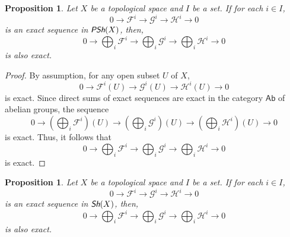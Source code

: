 \documentclass[oneside,11pt]{amsart}
\newtheorem{prop}[thm]{Proposition}
\theoremstyle{definition}
\theoremstyle{remark}
\begin{document}
\begin{prop}\label{prop1}
 Let $X$ be a topological space and $I$ be a set. If for each $i\in I$,
 \begin{equation*}
 0 \longrightarrow  \mathscr{F}^{i} \longrightarrow \mathscr{G}^{i} \longrightarrow \mathscr{H}^{i} \longrightarrow 0  
 \end{equation*}
 is an exact sequence in $\emph{\textsf{PSh}}(X)$, then,
 \begin{equation*}
   0 \longrightarrow  \bigoplus_{i}\mathscr{F}^{i} \longrightarrow \bigoplus_{i}\mathscr{G}^{i} \longrightarrow \bigoplus_{i}\mathscr{H}^{i} \longrightarrow 0 
 \end{equation*}
 is also exact.
\end{prop}
\begin{proof}
By assumption, for any open subset $U$ of $X$,
\begin{equation*}
 0 \longrightarrow \mathscr{F}^{i}(U)  \longrightarrow \mathscr{G}^{i}(U) \longrightarrow \mathscr{H}^{i}(U) \longrightarrow 0
\end{equation*}
is exact. Since direct sums of exact sequences are exact in the category $\textsf{Ab}$ of abelian groups, the sequence
\begin{equation*}
 0 \longrightarrow \left(\bigoplus_{i} \mathscr{F}^{i}\right)(U)  \longrightarrow  \left(\bigoplus_{i}\mathscr{G}^{i}\right)(U) \longrightarrow \left(\bigoplus_{i}\mathscr{H}^{i}\right)(U) \longrightarrow 0
\end{equation*}
is exact. Thus, it follows that
\begin{equation*}
 0 \longrightarrow \bigoplus_{i}\mathscr{F}^{i} \longrightarrow \bigoplus_{i}\mathscr{G}^{i} \longrightarrow \bigoplus_{i}\mathscr{H}^{i} \longrightarrow 0
\end{equation*}
is exact.
\end{proof}
\begin{prop}
 Let $X$ be a topological space and $I$ be a set. If for each $i\in I$,
 \begin{equation*}
 0 \longrightarrow  \mathscr{F}^{i} \longrightarrow \mathscr{G}^{i} \longrightarrow \mathscr{H}^{i} \longrightarrow 0  
 \end{equation*}
 is an exact sequence in $\emph{\textsf{Sh}}(X)$, then,
 \begin{equation}\label{eq2}
   0 \longrightarrow  \bigoplus_{i}\mathscr{F}^{i} \longrightarrow \bigoplus_{i}\mathscr{G}^{i} \longrightarrow \bigoplus_{i}\mathscr{H}^{i} \longrightarrow 0 
 \end{equation}
 is also exact.
\end{prop}
\end{document}
